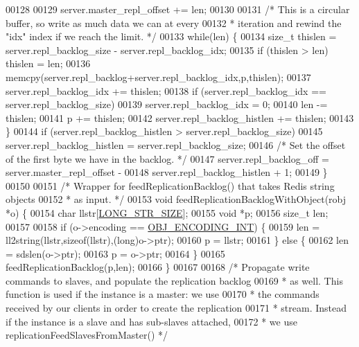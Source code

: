 \begin{DoxyCode}
{{00128 
00129     server.master\_repl\_offset += len;
00130 
00131     \textcolor{comment}{/* This is a circular buffer, so write as much data we can at every}
00132 \textcolor{comment}{     * iteration and rewind the "idx" index if we reach the limit. */}
00133     \textcolor{keywordflow}{while}(len) \{
00134         size\_t thislen = server.repl\_backlog\_size - server.repl\_backlog\_idx;
00135         \textcolor{keywordflow}{if} (thislen > len) thislen = len;
00136         memcpy(server.repl\_backlog+server.repl\_backlog\_idx,p,thislen);
00137         server.repl\_backlog\_idx += thislen;
00138         \textcolor{keywordflow}{if} (server.repl\_backlog\_idx == server.repl\_backlog\_size)
00139             server.repl\_backlog\_idx = 0;
00140         len -= thislen;
00141         p += thislen;
00142         server.repl\_backlog\_histlen += thislen;
00143     \}
00144     \textcolor{keywordflow}{if} (server.repl\_backlog\_histlen > server.repl\_backlog\_size)
00145         server.repl\_backlog\_histlen = server.repl\_backlog\_size;
00146     \textcolor{comment}{/* Set the offset of the first byte we have in the backlog. */}
00147     server.repl\_backlog\_off = server.master\_repl\_offset -
00148                               server.repl\_backlog\_histlen + 1;
00149 \}
00150 
00151 \textcolor{comment}{/* Wrapper for feedReplicationBacklog() that takes Redis string objects}
00152 \textcolor{comment}{ * as input. */}
00153 \textcolor{keywordtype}{void} feedReplicationBacklogWithObject(robj *o) \{
00154     \textcolor{keywordtype}{char} llstr[\hyperlink{server_8h_a39ec35278876f65fc1ef70b049856ca3}{LONG\_STR\_SIZE}];
00155     \textcolor{keywordtype}{void} *p;
00156     size\_t len;
00157 
00158     \textcolor{keywordflow}{if} (o->encoding == \hyperlink{server_8h_ae934cf008a0be0ef009c92c2d006a816}{OBJ\_ENCODING\_INT}) \{
00159         len = ll2string(llstr,\textcolor{keyword}{sizeof}(llstr),(\textcolor{keywordtype}{long})o->ptr);
00160         p = llstr;
00161     \} \textcolor{keywordflow}{else} \{
00162         len = sdslen(o->ptr);
00163         p = o->ptr;
00164     \}
00165     feedReplicationBacklog(p,len);
00166 \}
00167 
00168 \textcolor{comment}{/* Propagate write commands to slaves, and populate the replication backlog}
00169 \textcolor{comment}{ * as well. This function is used if the instance is a master: we use}
00170 \textcolor{comment}{ * the commands received by our clients in order to create the replication}
00171 \textcolor{comment}{ * stream. Instead if the instance is a slave and has sub-slaves attached,}
00172 \textcolor{comment}{ * we use replicationFeedSlavesFromMaster() */}
}}
\end{DoxyCode}

